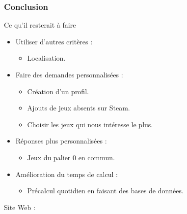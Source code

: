 \documentclass[10pt]{beamer}
\begin{document}
\begin{frame}
 \frametitle{Conclusion}
 
 \begin{block}{Ce qu'il resterait à faire}
  \begin{itemize}
   \item Utiliser d'autres critères : 
   \begin{itemize}
    \item Localisation.
   \end{itemize}
   \item Faire des demandes personnalisées : 
    \begin{itemize}
    \item Création d'un profil.
    \item Ajouts de jeux absents sur Steam.
    \item Choisir les jeux qui nous intéresse le plus.
    \end{itemize}
  \item Réponses plus personnalisées :
  \begin{itemize}
   \item Jeux du palier $0$ en commun.
  \end{itemize}
  \item Amélioration du temps de calcul :
  \begin{itemize}
   \item Précalcul quotidien en faisant des bases de données.
  \end{itemize}

  \end{itemize}
  
 \end{block}
 
 Site Web : 	

\end{frame}
\end{document}
